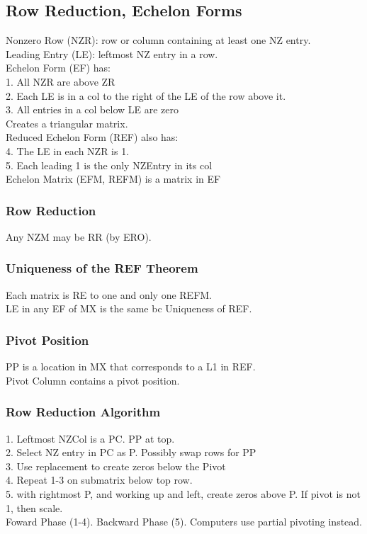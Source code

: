 \documentclass[12pt]{article}
\begin{document}
\subsection{Row Reduction, Echelon Forms}
    Nonzero Row (NZR): row or column containing at least one
    NZ entry. \\
    Leading Entry (LE): leftmost NZ entry in a row. \\
    Echelon Form (EF) has:\\
        1. All NZR are above ZR \\
        2. Each LE is in a col to the right of the LE of the row above it.\\
        3. All entries in a col below LE are zero \\
        Creates a triangular matrix. \\
    Reduced Echelon Form (REF) also has: \\
        4. The LE in each NZR is 1. \\
        5. Each leading 1 is the only NZEntry in its col \\
    Echelon Matrix (EFM, REFM) is a matrix in EF 
    \subsubsection{Row Reduction}
    Any NZM may be RR (by ERO).
    \subsubsection{Uniqueness of the REF Theorem}
        Each matrix is RE to one and only one REFM. \\
        LE in any EF of MX is the same bc Uniqueness of REF. 
    \subsubsection{Pivot Position}
        PP is a location in MX that corresponds to a L1 in REF. \\
        Pivot Column contains a pivot position. 
    \subsubsection{Row Reduction Algorithm}
        1. Leftmost NZCol is a PC. PP at top. \\
        2. Select NZ entry in PC as P. Possibly swap rows for PP \\
        3. Use replacement to create zeros below the Pivot \\
        4. Repeat 1-3 on submatrix below top row. \\
        5. with rightmost P, and working up and left, create zeros above P. 
        If pivot is not 1, then scale. \\
        Foward Phase (1-4). Backward Phase (5). Computers use partial pivoting instead.
\end{document}
